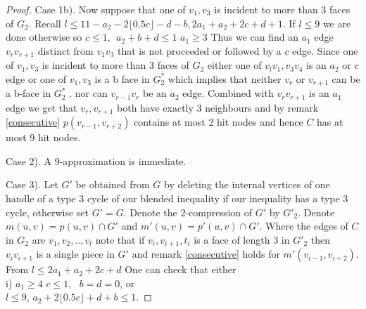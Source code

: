 \documentclass{article}
\newcommand{\0}{\mathbb{0}}
\newcommand{\1}{\mathbb{1}}
\begin{document}
\begin{proof}
 Case 1b). Now suppose that one of $v_1, v_3$ is incident to more than 3 faces of $G_2$. Recall  $ l \leq 11- a_2 -2 \lfloor 0.5 c \rfloor -d  -b , 2a_1+a_2+2c+d +1  $.  If $l \leq 9$ we are done otherwise so $c \leq 1, \ \ a_2+b+d \leq 1$  $ a_1 \geq 3 $
Thus we can find an $a_1$ edge $ v_r v_{r+1}$  distinct from $v_1 v_3$ that is not proceeded or followed by a $c$ edge. Since  one of $v_1, v_3$ is incident to more than 3 faces of $G_2$ either one of $ v_l v_1 , v_3 v_4$ is an $a_2$ or $ c $ edge or one of $ v_1, v_3$ is a b face in $G_2^*$ which implies that neither $v_r   $ or $v_{r+1}$ can be a b-face  in $G_2^*$ . nor can $v_{r-1} v_r$ be an $a_2$ edge. Combined with $ v_r v_{r+1}$ is an $a_1$ edge we get that $v_r,v_{r+1}$ both have exactly 3 neighbours and by remark \ref{consecutive}  $p(v_{r-1}, v_{r+2} )$ contains at most 2 hit nodes and hence $C$ has at most 9 hit nodes. 

Case 2).  A 9-approximation is immediate. 

Case 3). %
Let $G'$ be obtained from $G$ by deleting the internal vertices of one handle of a type 3 cycle of our blended inequality if our inequality has a type 3 cycle, otherwise set $G'=G$. Denote the 2-compression of $G'$ by $G'_2$.
Denote $m(u,v) =p(u,v) \cap G'$ and $m'(u,v)=p'(u,v) \cap G'$.   Where the edges of $C$ in $G_2$ are $v_1,v_2,..,v_l$ note that if $v_i,v_{i+1} , t_i$ is a face of length 3 in $ G'_2$ then $ v_i v_{i+1}$ is a single piece in $G'$ and remark \ref{consecutive} holds for $m'(v_{i-1},v_{i+2})$. From $l \leq 2a_1 + a_2 + 2c +d $
One can check that either \\
i) $a_1 \geq 4 $   $ c \leq 1, \ \ \ b=d=0 $, or \\ $ l \leq 9 $,   $a_2+ 2 \lfloor 0.5c \rfloor +d +b  \leq 1 $.


\end{proof}
\end{document}
